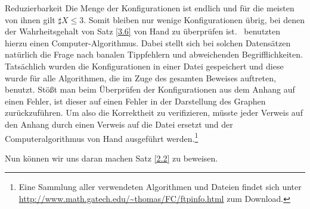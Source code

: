 \begin{section}{Reduzierbarkeit}
 Die Menge der Konfigurationen ist endlich und für die meisten von ihnen gilt $\sharp X \leq 3$. Somit bleiben nur wenige Konfigurationen übrig, bei denen der Wahrheitsgehalt von Satz \ref{3.6} von Hand zu überprüfen ist. \rsst \-\ benutzten hierzu einen Computer-Algorithmus. Dabei stellt sich bei solchen Datensätzen natürlich die Frage nach banalen Tippfehlern und abweichenden Begrifflichkeiten. Tatsächlich wurden die Konfigurationen in einer Datei gespeichert und diese wurde für alle Algorithmen, die im Zuge des gesamten Beweises auftreten, benutzt. Stößt man beim Überprüfen der Konfigurationen aus dem Anhang auf einen Fehler, ist dieser auf einen Fehler in der Darstellung des Graphen zurückzuführen. Um also die Korrektheit zu verifizieren, müsste jeder Verweis auf den Anhang durch einen Verweis auf die Datei ersetzt und der Computeralgorithmus von Hand ausgeführt werden.\footnote{Eine Sammlung aller verwendeten Algorithmen und Dateien findet sich unter \url{http://www.math.gatech.edu/~thomas/FC/ftpinfo.html} zum Download.}
 
 Nun können wir uns daran machen Satz \ref{2.2} zu beweisen.
 

\end{section}
